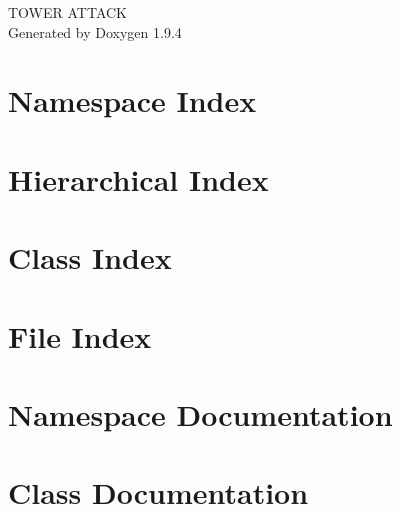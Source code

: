 \documentclass[twoside]{book}
\newcommand{\+}{\discretionary{\mbox{\scriptsize$\hookleftarrow$}}{}{}}
\newcommand{\clearemptydoublepage}{%
    \newpage{\pagestyle{empty}\cleardoublepage}%
  }
\begin{document}
  \raggedbottom
    \hypersetup{pageanchor=false,
                bookmarksnumbered=true,
                pdfencoding=unicode
               }
  \begin{titlepage}
  \vspace*{7cm}
  \begin{center}%
  {\Large TOWER ATTACK}\\
  \vspace*{1cm}
  {\large Generated by Doxygen 1.9.4}\\
  \end{center}
  \end{titlepage}
  \clearemptydoublepage
  \tableofcontents
  \clearemptydoublepage
  \hypersetup{pageanchor=true}
\chapter{Namespace Index}

\chapter{Hierarchical Index}

\chapter{Class Index}

\chapter{File Index}

\chapter{Namespace Documentation}

\chapter{Class Documentation}

























\end{document}
